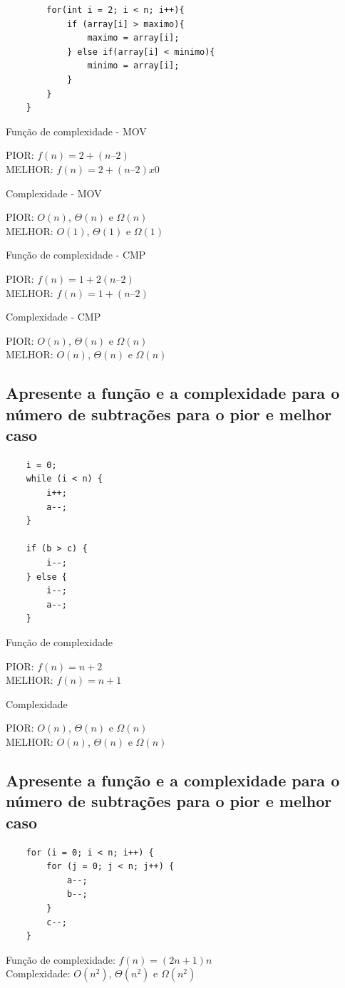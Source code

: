 \documentclass[12pt]{article}
\begin{document}
{\begin{lstlisting}
        for(int i = 2; i < n; i++){
            if (array[i] > maximo){
                maximo = array[i];
            } else if(array[i] < minimo){
                minimo = array[i];
            }
        }
    }
\end{lstlisting}
\begin{center}
    Função de complexidade - MOV
\end{center}
PIOR: $f(n) = 2 + (n – 2)$\\
MELHOR: $f(n) = 2 + (n – 2) x 0$\\
\begin{center}
    Complexidade - MOV
\end{center}
PIOR: $O(n)$, $\Theta(n)$ e $\Omega(n)$\\
MELHOR: $O(1)$, $\Theta(1)$ e $\Omega(1)$\\
\begin{center}
    Função de complexidade - CMP
\end{center}
PIOR: $f(n) = 1 + 2(n – 2)$\\
MELHOR: $f(n) = 1 + (n – 2)$\\
\begin{center}
    Complexidade - CMP
\end{center}
PIOR: $O(n)$, $\Theta(n)$ e $\Omega(n)$\\
MELHOR: $O(n)$, $\Theta(n)$ e $\Omega(n)$\\

\subsection{Apresente a função e a complexidade para o número de subtrações para o pior e melhor caso}
\begin{lstlisting}
    i = 0;
    while (i < n) {
        i++;
        a--;
    }
    
    if (b > c) {
        i--;
    } else {
        i--;
        a--;
    }
\end{lstlisting}

\begin{center}
    Função de complexidade
\end{center}
PIOR: $f(n) = n + 2$ \\
MELHOR: $f(n) = n +1$
\begin{center}
    Complexidade
\end{center}
PIOR: $O(n)$, $\Theta(n)$ e $\Omega(n)$\\
MELHOR: $O(n)$, $\Theta(n)$ e $\Omega(n)$

\subsection{Apresente a função e a complexidade para o número de subtrações para o pior e melhor caso}
\begin{lstlisting}
    for (i = 0; i < n; i++) {
        for (j = 0; j < n; j++) {
            a--;
            b--;
        }
        c--;
    }
\end{lstlisting}
Função de complexidade: $f(n) = (2n + 1)n$\\
Complexidade: $O(n^2)$, $\Theta(n^2)$ e $\Omega(n^2)$

}
\end{document}
